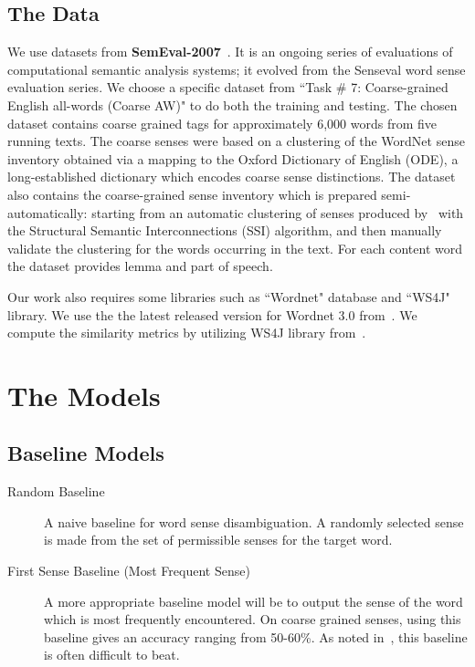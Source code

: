\documentclass[12pt,letterpaper]{article}
\newcommand{\blue}[1]{\textcolor{RoyalBlue}{#1}}
\newcommand{\instructions}[1]{\blue{\textit{#1}}}
\begin{document}
\subsection{The Data}
\label{sec:data}
We use datasets from \textbf{SemEval-2007}~\cite{semeval}. It is an ongoing series of evaluations of computational semantic analysis systems; it evolved from the Senseval word sense evaluation series. We choose a specific dataset from ``Task \# 7: Coarse-grained English all-words (Coarse AW)" to do both the training and testing. The chosen dataset contains coarse grained tags for approximately 6,000 words from five running texts. The coarse senses were based on a clustering of the WordNet sense inventory obtained via a mapping to the Oxford Dictionary of English (ODE), a long-established dictionary which encodes coarse sense distinctions. The dataset also contains the coarse-grained sense inventory which is prepared semi-automatically: starting from an automatic clustering of senses produced by~\cite{Navigli06} with the Structural Semantic Interconnections (SSI) algorithm, and then manually validate the clustering for the words occurring in the text. For each content word the dataset provides lemma and part of speech.

Our work also requires some libraries such as ``Wordnet" database and ``WS4J" library. We use the the latest released version for Wordnet 3.0 from~\cite{wordneturl}. We compute the similarity metrics by utilizing WS4J library from~\cite{WS4Jurl}.

\section{The Models}
\label{sec:models}

\subsection{Baseline Models}
\label{sec:baseline-models}
\begin{description}
\item[Random Baseline] A naive baseline for word sense disambiguation. A randomly selected sense is made from the set of permissible senses for the target word. \\
\item[First Sense Baseline (Most Frequent Sense)] A more appropriate baseline model will be to output the sense of the word which is most frequently encountered. On coarse grained senses, using this baseline gives an accuracy ranging from 50-60\%. As noted in~\cite{navigli2009word}, this baseline is often difficult to beat.
\end{description}
%
\end{document}
